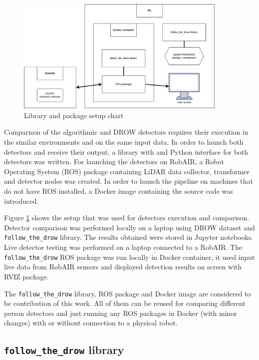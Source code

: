 \documentclass{article}
\begin{document}
\begin{figure}[t!]
	\centering
	\includegraphics[width=0.9\textwidth]{ftd_setup_chart}
	\caption{Library and package setup chart}
	\label{fig:ftd_setup_chart}
\end{figure}

Comparison of the algorithmic and DROW detectors requires their execution in the similar environments and on the same input data.
In order to launch both detectors and receive their output, a library with and Python interface for both detectors was written.
For launching the detectors on RobAIR, a Robot Operating System (ROS)\cite{ros_site} package containing LiDAR data collector, transformer and detector nodes was created.
In order to launch the pipeline on machines that do not have ROS installed, a Docker image containing the source code was introduced.

Figure \ref{fig:ftd_setup_chart} shows the setup that was used for detectors execution and comparison.
Detector comparison was performed locally on a laptop using DROW dataset and \texttt{follow\_the\_drow} library.
The results obtained were stored in Jupyter notebooks.
Live detector testing was performed on a laptop connected to a RobAIR.
The \texttt{follow\_the\_drow} ROS package was run locally in Docker container, it used input live data from RobAIR sensors and displayed detection results on screen with RVIZ\cite{rviz_wiki} package.

The \texttt{follow\_the\_drow} library, ROS package and Docker image are considered to be contribution of this work.
All of them can be reused for comparing different person detectors and just running any ROS packages in Docker (with minor changes) with or without connection to a physical robot.

\subsection{\texttt{follow\_the\_drow} library}
\end{document}
